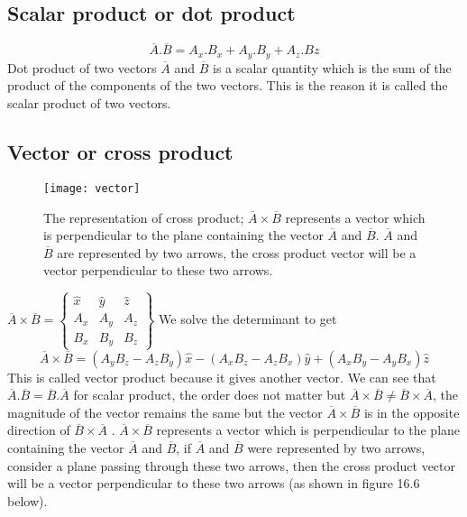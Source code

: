 	   \subsection{Scalar product or dot product}
	   \begin{equation}
	   \overline{A}.\overline{B} = A_{x}.B_{x} + A_{y}.B_{y} + A_{z}.B{z} 
	   \end{equation}
	   Dot product of two vectors $\overline{A}$ and $\overline{B}$ is a scalar quantity which is the sum of the product of the components of the two vectors. This is the reason it is called the scalar product of two vectors.
	   \subsection{Vector or cross product}
	    \begin{figure}[h]
	   	\centering
	   	\texttt{[image: vector]}
	   	\caption{The representation  of cross product; $\overline{A} \times \overline{B}$ represents a vector which is perpendicular to the plane containing the vector $\overline{A}$ and $\overline{B}$. $\overline{A}$ and $\overline{B}$ are represented by two arrows, the cross product vector will be a vector perpendicular to these two arrows.}
	   \end{figure}
	   $\overline{A} \times \overline{B} = 
	   \begin{Bmatrix}
	   	\hat{x} & \hat{y} & \hat{z}\\
	   	A_{x} & A_{y} & A_{z} \\
	    B_{x} & B_{y} & B_{z} 
	   \end{Bmatrix}$
   We solve the determinant to get 
   \begin{equation}
   \overline{A} \times \overline{B} = (A_{y}B_{z} - A_{z}B_{y})\hat{x} - (A_{x}B_{z} - A_{z}B_{x})\hat{y} + (A_{x}B_{y} - A_{y}B_{x})\hat{z}
   \end{equation}
   This is called vector product because it gives another vector. We can see that $\overline{A}.\overline{B} = \overline{B}.\overline{A} $ for scalar product, the order does not matter but $\overline{A} \times \overline{B} \neq \overline{B} \times \overline{A}$, the magnitude of the vector remains the same but the vector $\overline{A} \times \overline{B}$ is in the opposite direction of $\overline{B} \times \overline{A}$ . $\overline{A} \times \overline{B}$ represents a vector which is perpendicular to the plane containing the vector $\overline{A}$ and $\overline{B}$, if $\overline{A}$ and $\overline{B}$ were represented by two arrows, consider a plane passing through these two arrows, then the cross product vector will be a vector perpendicular to these two arrows (as shown in figure 16.6 below).\\
